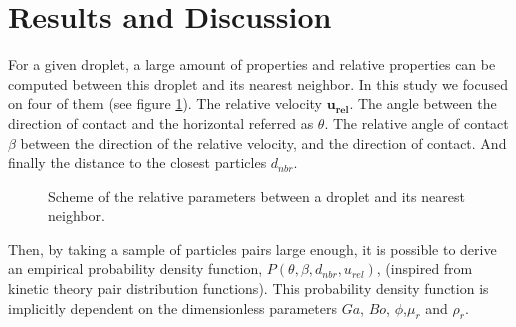 \documentclass[twocolumn,a4paper,10pt]{scrartcl}
\begin{document}
\section*{Results and Discussion}

For a given droplet, a large amount of properties and relative properties can be computed between this droplet and its nearest neighbor. 
In this study we focused on four of them (see figure \ref{fig:droplets}). 
The relative velocity $\bm{u_{rel}}$.
The angle between the direction of contact and the horizontal  referred as $\theta$. 
The relative angle of contact $\beta$ between the direction of the relative velocity, and the direction of contact. 
And finally the distance to the closest particles $d_{nbr}$. 
\begin{figure}[h]
    \centering
    \caption{Scheme of the relative parameters between a droplet and its nearest neighbor.}
    \label{fig:droplets}
\end{figure}
Then, by taking a sample of particles pairs large enough, it is possible to derive an empirical probability density function, $P(\theta,\beta,d_{nbr},u_{rel})$, (inspired from kinetic theory pair distribution functions).
This probability density function is implicitly dependent on the dimensionless parameters $Ga$, $Bo$, $\phi$,$\mu_r$ and $\rho_r$.
\end{document}
